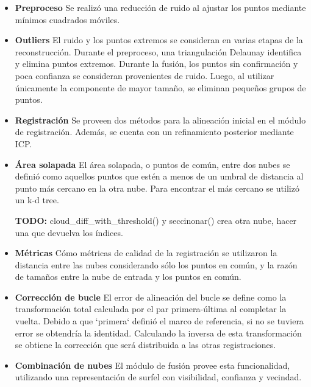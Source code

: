 \documentclass{pfc}
\newcommand{\Alerta}[1]{{\Huge\bfseries\sffamily#1}}
\newcommand{\NombreItem}[1]{{\bfseries#1}}
\begin{document}
		\begin{itemize}
			\item  \NombreItem{Preproceso}
				Se realizó una reducción de ruido al ajustar los puntos mediante mínimos cuadrados móviles.

			\item  \NombreItem{Outliers}
				El ruido y los puntos extremos se consideran en varias etapas de la reconstrucción.
				Durante el preproceso, una triangulación Delaunay identifica y elimina puntos extremos.
				Durante la fusión, los puntos sin confirmación y poca confianza se consideran provenientes de ruido.
				Luego, al utilizar únicamente la componente de mayor tamaño, se eliminan pequeños grupos de puntos.

			\item  \NombreItem{Registración}
				Se proveen dos métodos para la alineación inicial en el módulo de registración.
				Además, se cuenta con un refinamiento posterior mediante ICP.

			\item  \NombreItem{Área solapada}
				El área solapada, o puntos de común, entre dos nubes
				se definió como aquellos puntos que estén a menos de un umbral de distancia
				al punto más cercano en la otra nube.
				Para encontrar el más cercano se utilizó un k-d tree.

				\Alerta{TODO:} cloud\_diff\_with\_threshold() y seccinonar() crea otra nube, hacer una que devuelva los índices.

			\item  \NombreItem{Métricas}
				Cómo métricas de calidad de la registración se utilizaron la distancia entre
				las nubes considerando sólo los puntos en común, y la razón de tamaños entre la
				nube de entrada y los puntos en común.

			\item  \NombreItem{Corrección de bucle}
				El error de alineación del bucle se define como la transformación total
				calculada por el par primera-última al completar la vuelta. Debido a que `primera`
				definió el marco de referencia, si no se tuviera error se obtendría la identidad.
				Calculando la inversa de esta transformación se obtiene la corrección que será distribuida
				a las otras registraciones.

			\item  \NombreItem{Combinación de nubes}
				El módulo de fusión provee esta funcionalidad, utilizando una
				representación de surfel con visibilidad, confianza y vecindad.


\end{itemize}
\end{document}
